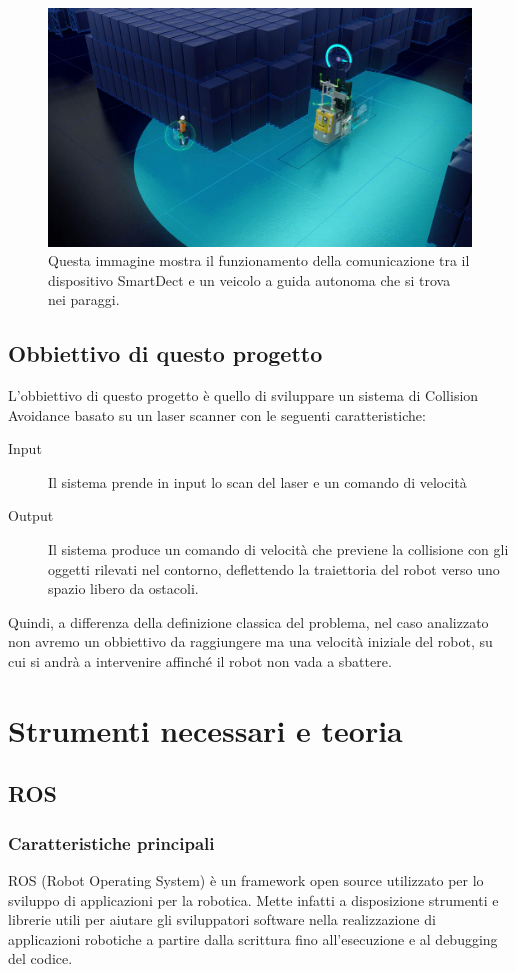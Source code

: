 \documentclass[Lau, binding=0.6cm, oneside]{sapthesis}
\begin{document}
\begin{figure}[H]
    \centering
    \includegraphics[width=12.5cm]{smart_dect.png}
    \caption{Questa immagine mostra il funzionamento della comunicazione tra il dispositivo SmartDect e un veicolo a guida autonoma che si trova nei paraggi.}
    \label{fig:smart_dect}
\end{figure}

\section{Obbiettivo di questo progetto}
L'obbiettivo di questo progetto è quello di sviluppare un sistema di Collision Avoidance basato su un laser scanner con le seguenti caratteristiche:
\begin{description}
	\item[Input] Il sistema prende in input lo scan del laser e un comando di velocità
	\item[Output] Il sistema produce un comando di velocità che previene la collisione con gli oggetti rilevati nel contorno, deflettendo la traiettoria del robot verso uno spazio libero da ostacoli.
\end{description}

Quindi, a differenza della definizione classica del problema, nel caso analizzato non avremo un obbiettivo da raggiungere ma una velocità iniziale del robot, su cui si andrà a intervenire affinché il robot non vada a sbattere.

\chapter{Strumenti necessari e teoria}
\section{ROS}
\subsection{Caratteristiche principali}
ROS (Robot Operating System) è un framework open source utilizzato per lo sviluppo di applicazioni per la robotica.
Mette infatti a disposizione strumenti e librerie utili per aiutare gli sviluppatori software nella realizzazione di applicazioni robotiche a partire dalla scrittura fino all’esecuzione e al debugging del codice.
\end{document}
